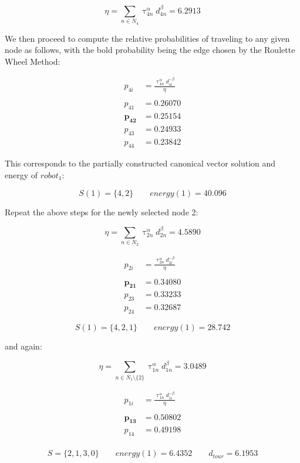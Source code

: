 \documentclass[a4paper]{article}
\begin{document}
$$
\eta = \sum_{n \in N_4} \uptau_{4n}^\alpha d_{4n}^\beta = 6.2913
$$

We then proceed to compute the relative probabilities of traveling to any given node as follows, with the bold probability being the edge chosen by the Roulette Wheel Method:

\begin{align*}
p_{4i} &= \frac{\uptau_{4n}^\alpha d_{4i}^{-\beta}}{\eta} \\
\\
p_{41} &= 0.26070 \\
\mathbf{p_{42}} &= \mathbf{0.25154} \\
p_{43} &= 0.24933 \\
p_{44} &= 0.23842
\end{align*}

This corresponds to the partially constructed canonical vector solution and energy of $robot_1$:

$$
S(1) = \{4, 2\} \qquad \mathit{energy}(1) = 40.096
$$


Repeat the above steps for the newly selected node 2:

$$
\eta = \sum_{n \in N_2} \uptau_{2n}^\alpha d_{2n}^\beta = 4.5890
$$

\begin{align*}
p_{2i} &= \frac{\uptau_{2n}^\alpha d_{2i}^{-\beta}}{\eta} \\
\\
\mathbf{p_{21}} &= \mathbf{0.34080} \\
p_{23} &= 0.33233 \\
p_{24} &= 0.32687
\end{align*}

$$
S(1) = \{4, 2, 1\} \qquad \mathit{energy}(1) = 28.742
$$

and again:

$$
\eta = \sum_{n \in N_1\setminus\{2\}} \uptau_{1n}^\alpha d_{1n}^\beta = 3.0489
$$

\begin{align*}
p_{1i} &= \frac{\uptau_{1n}^\alpha d_{1i}^{-\beta}}{\eta} \\
\\
\mathbf{p_{13}} &= \mathbf{0.50802} \\
p_{14} &= 0.49198 \\
\end{align*}

$$
S = \{2, 1, 3, 0\} \qquad \mathit{energy}(1) = 6.4352 \qquad d_{tour} = 6.1953
$$
\end{document}
